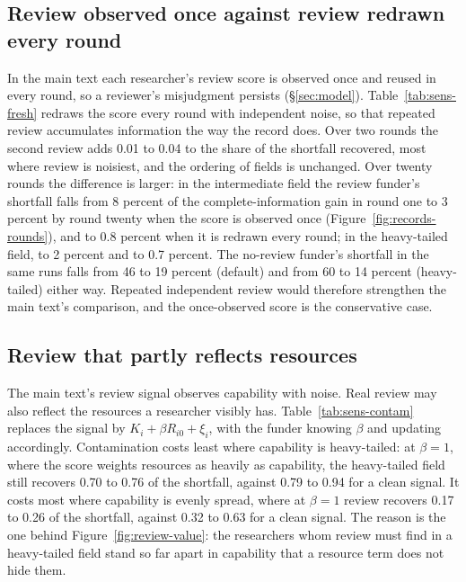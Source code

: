 

\subsection*{Review observed once against review redrawn every round}
In the main text each researcher's review score is observed once and reused in every round, so a reviewer's misjudgment persists (\S\ref{sec:model}). Table~\ref{tab:sens-fresh} redraws the score every round with independent noise, so that repeated review accumulates information the way the record does. Over two rounds the second review adds 0.01 to 0.04 to the share of the shortfall recovered, most where review is noisiest, and the ordering of fields is unchanged. Over twenty rounds the difference is larger: in the intermediate field the review funder's shortfall falls from 8 percent of the complete-information gain in round one to 3 percent by round twenty when the score is observed once (Figure~\ref{fig:records-rounds}), and to 0.8 percent when it is redrawn every round; in the heavy-tailed field, to 2 percent and to 0.7 percent. The no-review funder's shortfall in the same runs falls from 46 to 19 percent (default) and from 60 to 14 percent (heavy-tailed) either way. Repeated independent review would therefore strengthen the main text's comparison, and the once-observed score is the conservative case.



\subsection*{Review that partly reflects resources}
The main text's review signal observes capability with noise. Real review may also reflect the resources a researcher visibly has. Table~\ref{tab:sens-contam} replaces the signal by $K_i + \beta R_{i0} + \xi_i$, with the funder knowing $\beta$ and updating accordingly. Contamination costs least where capability is heavy-tailed: at $\beta = 1$, where the score weights resources as heavily as capability, the heavy-tailed field still recovers 0.70 to 0.76 of the shortfall, against 0.79 to 0.94 for a clean signal. It costs most where capability is evenly spread, where at $\beta = 1$ review recovers 0.17 to 0.26 of the shortfall, against 0.32 to 0.63 for a clean signal. The reason is the one behind Figure~\ref{fig:review-value}: the researchers whom review must find in a heavy-tailed field stand so far apart in capability that a resource term does not hide them.

